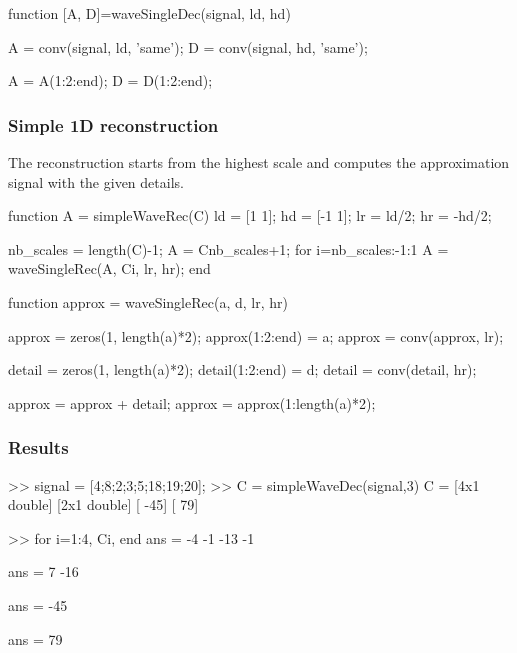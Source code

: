 \begin{matlab}
function [A, D]=waveSingleDec(signal, ld, hd)

A = conv(signal, ld, 'same');
D = conv(signal, hd, 'same');

A = A(1:2:end);
D = D(1:2:end);
\end{matlab}

\subsubsection{Simple 1D reconstruction}
The reconstruction starts from the highest scale and computes the approximation signal with the given details.
\begin{matlab}
function A = simpleWaveRec(C)
%
ld = [1 1];
hd = [-1 1];
lr = ld/2;
hr = -hd/2;

nb_scales = length(C)-1;
A = C{nb_scales+1};
for i=nb_scales:-1:1
    A = waveSingleRec(A, C{i}, lr, hr);
end
\end{matlab}

\begin{matlab}
function approx = waveSingleRec(a, d, lr, hr)
%

approx = zeros(1, length(a)*2);
approx(1:2:end) = a;
approx = conv(approx, lr);

detail = zeros(1, length(a)*2);
detail(1:2:end) = d;
detail = conv(detail, hr);

approx = approx + detail;
approx = approx(1:length(a)*2);
\end{matlab}
\subsubsection{Results}
\begin{mwindow}
>> signal = [4;8;2;3;5;18;19;20];
>> C = simpleWaveDec(signal,3)
C = 
    [4x1 double]
    [2x1 double]
    [       -45]
    [        79]
    
>> for i=1:4, C{i}, end
ans =
    -4
    -1
   -13
    -1

ans =
     7
   -16

ans =
   -45

ans =
    79
\end{mwindow}


